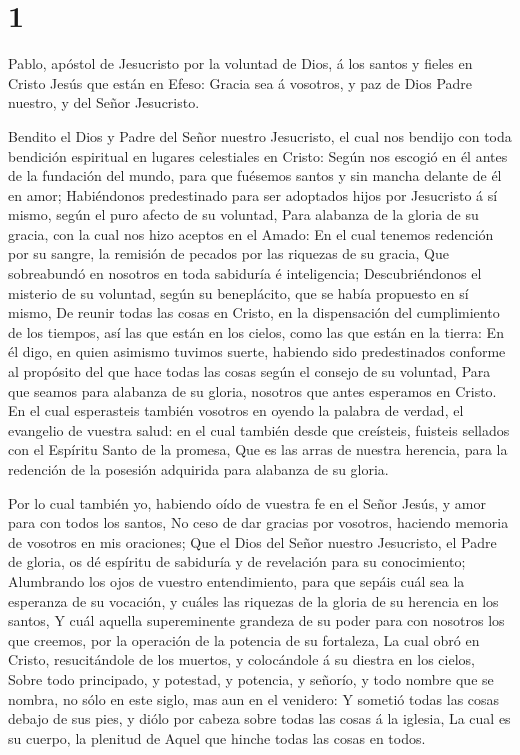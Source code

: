\hypertarget{section}{%
\section{1}\label{section}}

 Pablo, apóstol de Jesucristo por la voluntad de Dios, á los
santos y fieles en Cristo Jesús que están en Efeso:  Gracia
sea á vosotros, y paz de Dios Padre nuestro, y del Señor Jesucristo.

 Bendito el Dios y Padre del Señor nuestro Jesucristo, el
cual nos bendijo con toda bendición espiritual en lugares celestiales en
Cristo:  Según nos escogió en él antes de la fundación del
mundo, para que fuésemos santos y sin mancha delante de él en amor;
 Habiéndonos predestinado para ser adoptados hijos por
Jesucristo á sí mismo, según el puro afecto de su voluntad, 
Para alabanza de la gloria de su gracia, con la cual nos hizo aceptos en
el Amado:  En el cual tenemos redención por su sangre, la
remisión de pecados por las riquezas de su gracia,  Que
sobreabundó en nosotros en toda sabiduría é inteligencia; 
Descubriéndonos el misterio de su voluntad, según su beneplácito, que se
había propuesto en sí mismo,  De reunir todas las cosas en
Cristo, en la dispensación del cumplimiento de los tiempos, así las que
están en los cielos, como las que están en la tierra:  En
él digo, en quien asimismo tuvimos suerte, habiendo sido predestinados
conforme al propósito del que hace todas las cosas según el consejo de
su voluntad,  Para que seamos para alabanza de su gloria,
nosotros que antes esperamos en Cristo.  En el cual
esperasteis también vosotros en oyendo la palabra de verdad, el
evangelio de vuestra salud: en el cual también desde que creísteis,
fuisteis sellados con el Espíritu Santo de la promesa,  Que
es las arras de nuestra herencia, para la redención de la posesión
adquirida para alabanza de su gloria.

 Por lo cual también yo, habiendo oído de vuestra fe en el
Señor Jesús, y amor para con todos los santos,  No ceso de
dar gracias por vosotros, haciendo memoria de vosotros en mis oraciones;
 Que el Dios del Señor nuestro Jesucristo, el Padre de
gloria, os dé espíritu de sabiduría y de revelación para su
conocimiento;  Alumbrando los ojos de vuestro
entendimiento, para que sepáis cuál sea la esperanza de su vocación, y
cuáles las riquezas de la gloria de su herencia en los santos,
 Y cuál aquella supereminente grandeza de su poder para con
nosotros los que creemos, por la operación de la potencia de su
fortaleza,  La cual obró en Cristo, resucitándole de los
muertos, y colocándole á su diestra en los cielos,  Sobre
todo principado, y potestad, y potencia, y señorío, y todo nombre que se
nombra, no sólo en este siglo, mas aun en el venidero:  Y
sometió todas las cosas debajo de sus pies, y diólo por cabeza sobre
todas las cosas á la iglesia,  La cual es su cuerpo, la
plenitud de Aquel que hinche todas las cosas en todos.

